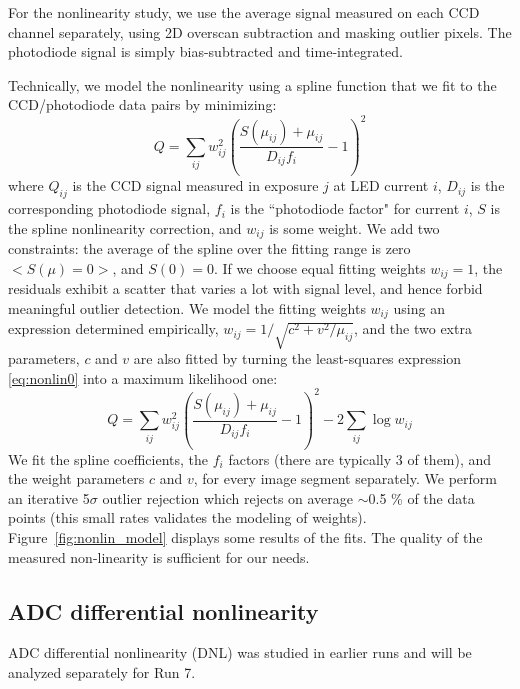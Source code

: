 For the nonlinearity study, we use the average signal measured on each CCD channel separately, using 2D overscan subtraction and masking outlier pixels. The photodiode signal is simply bias-subtracted and time-integrated. 

Technically, we model the nonlinearity using a spline function that we fit to the CCD/photodiode data pairs by minimizing:
\begin{equation}
Q = \sum_{ij} w_{ij}^2 \left( \frac{ S(\mu_{ij}) +\mu_{ij}  }{D_{ij} f_i} -1 \right)^2
\label{eq:nonlin0}
\end{equation}
where $Q_{ij}$ is the CCD signal measured in exposure $j$ at LED current $i$,
$D_{ij}$ is the corresponding photodiode signal, $f_i$ is the ``photodiode factor" for current $i$, $S$ is the spline nonlinearity correction, and $w_{ij}$ is some weight. We add two constraints: the average of the spline over the fitting range is zero $<S(\mu)=0>$, and $S(0) = 0$. If we choose equal fitting weights $w_{ij}=1$, the residuals exhibit a scatter that varies a lot with signal level, and hence forbid meaningful outlier detection. We model the fitting weights $w_{ij}$ using an expression determined empirically, $w_{ij} = 1/\sqrt{c^2+v^2/\mu_{ij}}$, and the two extra parameters, $c$ and $v$ are also fitted by turning the least-squares expression \ref{eq:nonlin0} into a maximum likelihood one:
\begin{equation}
Q = \sum_{ij} w_{ij}^2 \left( \frac{ S(\mu_{ij}) +\mu_{ij}  }{D_{ij} f_i} -1 \right)^2 - 2 \sum_{ij} \log w_{ij}
\label{eq:nonlin1}
\end{equation}
We fit the spline coefficients, the $f_i$ factors (there are typically 3 of them), and the weight parameters $c$ and $v$, for every image segment separately. We perform an iterative 5$\sigma$ outlier rejection which rejects on average $\sim $0.5 \% of the data points (this small rates validates the modeling of weights). Figure~\ref{fig:nonlin_model} displays some results of the fits. The quality of the measured non-linearity is sufficient for our needs.   


\subsection{ADC differential nonlinearity}
ADC differential nonlinearity (DNL) was studied in earlier runs and will be analyzed separately for Run 7.


